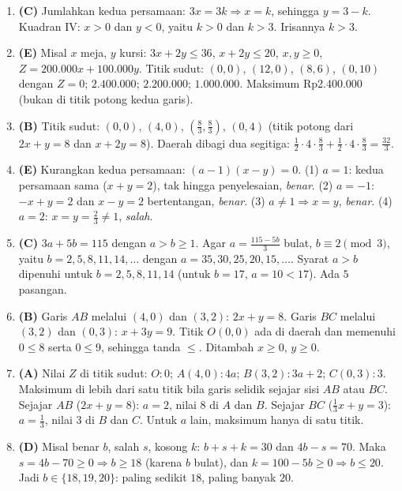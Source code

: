 \documentclass[a4paper,11pt]{article}
\newcommand{\dis}{\displaystyle}
\newcounter{no}
\begin{document}
\begin{enumerate}[leftmargin=2em,itemsep=2pt,topsep=2pt]
\item[\textbf{13.}] \textbf{(C)} Jumlahkan kedua persamaan: $3x=3k\Rightarrow x=k$, sehingga $y=3-k$. Kuadran IV: $x>0$ dan $y<0$, yaitu $k>0$ dan $k>3$. Irisannya $k>3$.
\item[\textbf{14.}] \textbf{(E)} Misal $x$ meja, $y$ kursi: $3x+2y\le36$, $x+2y\le20$, $x,y\ge0$, $Z=200.000x+100.000y$. Titik sudut: $(0,0)$, $(12,0)$, $(8,6)$, $(0,10)$ dengan $Z=0$; $2.400.000$; $2.200.000$; $1.000.000$. Maksimum Rp2.400.000 (bukan di titik potong kedua garis).
\item[\textbf{15.}] \textbf{(B)} Titik sudut: $(0,0)$, $(4,0)$, $\left(\frac83,\frac83\right)$, $(0,4)$ (titik potong dari $2x+y=8$ dan $x+2y=8$). Daerah dibagi dua segitiga: $\frac12\cdot4\cdot\frac83+\frac12\cdot4\cdot\frac83=\dis\frac{32}{3}$.
\item[\textbf{16.}] \textbf{(E)} Kurangkan kedua persamaan: $(a-1)(x-y)=0$. (1) $a=1$: kedua persamaan sama ($x+y=2$), tak hingga penyelesaian, \emph{benar}. (2) $a=-1$: $-x+y=2$ dan $x-y=2$ bertentangan, \emph{benar}. (3) $a\neq1\Rightarrow x=y$, \emph{benar}. (4) $a=2$: $x=y=\frac23\neq1$, \emph{salah}.
\item[\textbf{17.}] \textbf{(C)} $3a+5b=115$ dengan $a>b\ge1$. Agar $a=\frac{115-5b}{3}$ bulat, $b\equiv2\pmod3$, yaitu $b=2,5,8,11,14,\dots$ dengan $a=35,30,25,20,15,\dots$. Syarat $a>b$ dipenuhi untuk $b=2,5,8,11,14$ (untuk $b=17$, $a=10<17$). Ada $5$ pasangan.
\item[\textbf{18.}] \textbf{(B)} Garis $AB$ melalui $(4,0)$ dan $(3,2)$: $2x+y=8$. Garis $BC$ melalui $(3,2)$ dan $(0,3)$: $x+3y=9$. Titik $O(0,0)$ ada di daerah dan memenuhi $0\le8$ serta $0\le9$, sehingga tanda $\le$. Ditambah $x\ge0$, $y\ge0$.
\item[\textbf{19.}] \textbf{(A)} Nilai $Z$ di titik sudut: $O:0$; $A(4,0):4a$; $B(3,2):3a+2$; $C(0,3):3$. Maksimum di lebih dari satu titik bila garis selidik sejajar sisi $AB$ atau $BC$. Sejajar $AB$ ($2x+y=8$): $a=2$, nilai $8$ di $A$ dan $B$. Sejajar $BC$ ($\frac13x+y=3$): $a=\frac13$, nilai $3$ di $B$ dan $C$. Untuk $a$ lain, maksimum hanya di satu titik.
\item[\textbf{20.}] \textbf{(D)} Misal benar $b$, salah $s$, kosong $k$: $b+s+k=30$ dan $4b-s=70$. Maka $s=4b-70\ge0\Rightarrow b\ge18$ (karena $b$ bulat), dan $k=100-5b\ge0\Rightarrow b\le20$. Jadi $b\in\{18,19,20\}$: paling sedikit $18$, paling banyak $20$.
\end{enumerate}
\par{}\par\vspace{0.2em}
\end{document}
